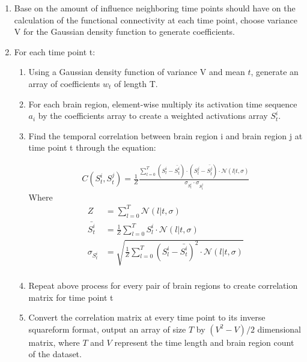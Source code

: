 \documentclass[12pt]{article}
\begin{document}
\begin{enumerate}
\item Base on the amount of influence neighboring time points should have on the calculation of the functional connectivity at each time point, choose variance V for the Gaussian density function to generate coefficients.

\item For each time point t:
\begin{enumerate}
\item Using a Gaussian density function of variance V and mean $t$, generate an array of coefficients $w_t$ of length T.

\item For each brain region, element-wise multiply its activation time sequence $a_i$ by the coefficients array to create a weighted activations array $S^i_t$.

\item Find the temporal correlation between brain region i and brain region j at time point t through the equation:

\begin{align*}
C(S^i_t,S^j_t) = \frac{1}{Z}\frac{\sum_{l=0}^T (S_l^i - \bar{S^i_t})\cdot(S^j_l - \bar{S^j_t})\cdot \mathcal{N}(l|t,\sigma)}{\sigma_{S_t^i} \cdot \sigma_{S_t^j}}
\end{align*}
Where
\begin{align*}
Z &= \sum_{l=0}^T \mathcal{N}(l|t,\sigma)\\
\bar{S^i_t} &=\frac{1}{Z} \sum_{l=0}^T S^i_l \cdot \mathcal{N}(l|t,\sigma)\\
\sigma_{S_t^i} &=\sqrt{ \frac{1}{Z}\sum_{l=0}^T (S_l^i-\bar{S_t^i})^2 \cdot \mathcal{N}(l|t,\sigma)}\\
\end{align*}
\item Repeat above process for every pair of brain regions to create correlation matrix for time point t
\item Convert the correlation matrix at every time point to its inverse squareform format, output an array of size $T$ by $(V^2-V)/2$ dimensional matrix, where $T$ and $V$ represent the time length and brain region count of the dataset.
\end{enumerate}
\end{enumerate}
\end{document}
